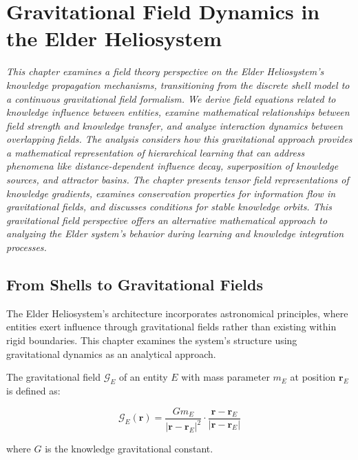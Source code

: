 \chapter{Gravitational Field Dynamics in the Elder Heliosystem}

\textit{This chapter examines a field theory perspective on the Elder Heliosystem's knowledge propagation mechanisms, transitioning from the discrete shell model to a continuous gravitational field formalism. We derive field equations related to knowledge influence between entities, examine mathematical relationships between field strength and knowledge transfer, and analyze interaction dynamics between overlapping fields. The analysis considers how this gravitational approach provides a mathematical representation of hierarchical learning that can address phenomena like distance-dependent influence decay, superposition of knowledge sources, and attractor basins. The chapter presents tensor field representations of knowledge gradients, examines conservation properties for information flow in gravitational fields, and discusses conditions for stable knowledge orbits. This gravitational field perspective offers an alternative mathematical approach to analyzing the Elder system's behavior during learning and knowledge integration processes.}

\section{From Shells to Gravitational Fields}

The Elder Heliosystem's architecture incorporates astronomical principles, where entities exert influence through gravitational fields rather than existing within rigid boundaries. This chapter examines the system's structure using gravitational dynamics as an analytical approach.

\begin{definition}
The gravitational field $\mathcal{G}_E$ of an entity $E$ with mass parameter $m_E$ at position $\mathbf{r}_E$ is defined as:

\begin{equation}
\mathcal{G}_E(\mathbf{r}) = \frac{G m_E}{|\mathbf{r} - \mathbf{r}_E|^2} \cdot \frac{\mathbf{r} - \mathbf{r}_E}{|\mathbf{r} - \mathbf{r}_E|}
\end{equation}

where $G$ is the knowledge gravitational constant.
\end{definition}

